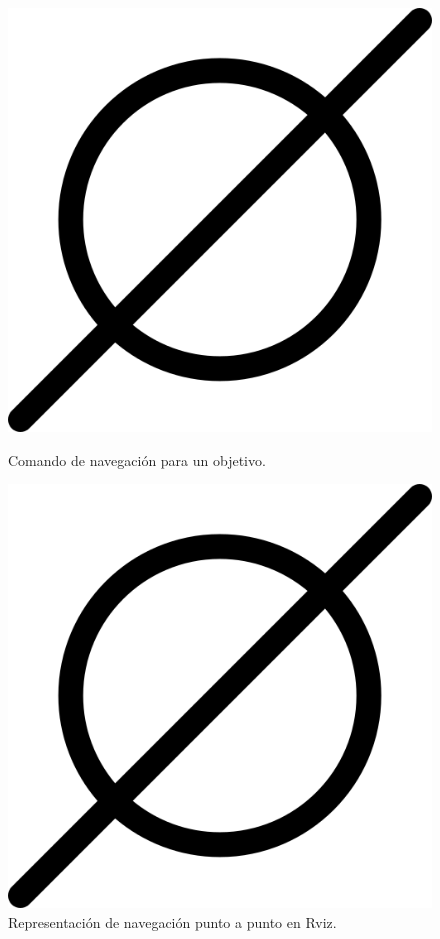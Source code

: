 \begin{figure}[htbp]
  \centering
  \begin{minipage}[b]{0.45\textwidth}
    \centering
    \includegraphics[width=\textwidth]{images/poner_foto.png}
    \caption{Comando de navegación para un objetivo.}
    \label{fig:navegacion_punto_punto_web}
  \end{minipage}
  \hfill
  \begin{minipage}[b]{0.45\textwidth}
    \centering
    \includegraphics[width=\textwidth]{images/poner_foto.png}
    \caption{Representación de navegación punto a punto en Rviz.}
    \label{fig:navegacion_punto_punto_rviz}
  \end{minipage}
\end{figure}

